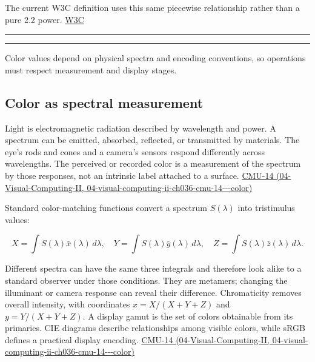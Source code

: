 The current W3C definition uses this same piecewise relationship rather than a pure 2.2 power. \href{https://www.w3.org/TR/2026/CRD-css-color-4-20261009/?utm_source=chatgpt.com}{W3C}

\begin{center}\rule{0.5\linewidth}{0.5pt}\end{center}

\begin{center}\rule{0.5\linewidth}{0.5pt}\end{center}

Color values depend on physical spectra and encoding conventions, so operations must respect measurement and display stages.

\subsection{Color as spectral measurement}\label{03-visual-computing-i-ch004-color-as-spectral-measurement}

Light is electromagnetic radiation described by wavelength and power. A spectrum can be emitted, absorbed, reflected, or transmitted by materials. The eye's rods and cones and a camera's sensors respond differently across wavelengths. The perceived or recorded color is a measurement of the spectrum by those responses, not an intrinsic label attached to a surface. \href{../04-Visual-Computing-II/main.pdf\#nameddest=04-visual-computing-ii-ch036-cmu-14---color}{CMU-14 (04-Visual-Computing-II, 04-visual-computing-ii-ch036-cmu-14-\/-\/-color)}

Standard color-matching functions convert a spectrum \(S(\lambda)\) into tristimulus values:

\[
X=\int S(\lambda)\bar x(\lambda)\,d\lambda,\quad
Y=\int S(\lambda)\bar y(\lambda)\,d\lambda,\quad
Z=\int S(\lambda)\bar z(\lambda)\,d\lambda.
\]

Different spectra can have the same three integrals and therefore look alike to a standard observer under those conditions. They are metamers; changing the illuminant or camera response can reveal their difference. Chromaticity removes overall intensity, with coordinates \(x=X/(X+Y+Z)\) and \(y=Y/(X+Y+Z)\). A display gamut is the set of colors obtainable from its primaries. CIE diagrams describe relationships among visible colors, while sRGB defines a practical display encoding. \href{../04-Visual-Computing-II/main.pdf\#nameddest=04-visual-computing-ii-ch036-cmu-14---color}{CMU-14 (04-Visual-Computing-II, 04-visual-computing-ii-ch036-cmu-14-\/-\/-color)}

